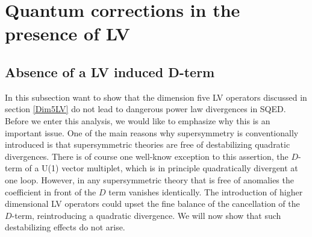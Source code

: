 \documentclass[12pt]{revtex4}
\begin{document}
\section{Quantum corrections in the presence of LV}
\label{quantum}




\subsection{Absence of a LV induced D-term}
\label{noDterm}


In this subsection want to show that the dimension five LV operators
discussed in section \ref{Dim5LV} do not lead to dangerous power 
law divergences in SQED. Before we enter this analysis, we would like
to emphasize why this is an important issue. One of the main reasons
why supersymmetry is conventionally introduced is that 
supersymmetric theories are free of destabilizing quadratic
divergences. There is of course one well-know 
exception to this assertion, the $D$-term of a U(1) vector multiplet,
which is in principle quadratically divergent at one loop. 
However, in any supersymmetric theory that is free of anomalies the
coefficient in front of the $D$ term vanishes identically. The
introduction of higher dimensional LV operators could upset the fine
balance of the cancellation of the $D$-term, reintroducing a quadratic
divergence. We will now show that such destabilizing effects do not
arise. 
\end{document}

